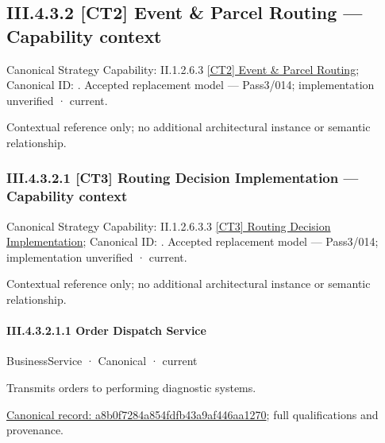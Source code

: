 \subsection*{III.4.3.2 [CT2] Event \& Parcel Routing — Capability context}
\label{navigation:III.4.3.2}

{\small Canonical Strategy Capability: II.1.2.6.3 \hyperref[element:3651fa9017f84b81a8a12b7a9a6c01a4]{[CT2] Event \& Parcel Routing}; Canonical ID: \texttt{}. Accepted replacement model — Pass3/014; implementation unverified · current.}\par
Contextual reference only; no additional architectural instance or semantic relationship.\par
\subsubsection*{III.4.3.2.1 [CT3] Routing Decision Implementation — Capability context}
\label{navigation:III.4.3.2.1}

{\small Canonical Strategy Capability: II.1.2.6.3.3 \hyperref[element:2272dc936e6a4243a12049cd007df5d5]{[CT3] Routing Decision Implementation}; Canonical ID: \texttt{}. Accepted replacement model — Pass3/014; implementation unverified · current.}\par
Contextual reference only; no additional architectural instance or semantic relationship.\par
\paragraph*{III.4.3.2.1.1 Order Dispatch Service}
\label{navigation:III.4.3.2.1.1}

\label{element:a8b0f7284a854fdfb43a9af446aa1270}
{\small BusinessService · Canonical · current}\par

Transmits orders to performing diagnostic systems.


{\footnotesize \href{../../../../../../../../continuum/business/business-service/a8b0f7284a854fdfb43a9af446aa1270.md}{Canonical record: a8b0f7284a854fdfb43a9af446aa1270}; full qualifications and provenance.}\par
